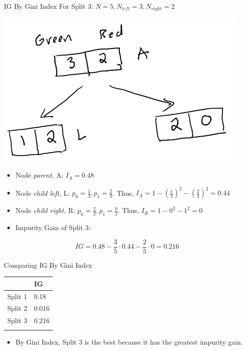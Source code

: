 \documentclass[
  ignorenonframetext,
]{beamer}
\providecommand{\tightlist}{%
  \setlength{\itemsep}{0pt}\setlength{\parskip}{0pt}}
\begin{document}
\begin{frame}{IG By Gini Index}
\label{ig-by-gini-index-2}
For Split 3: \(N = 5, N_{left} =3, N_{right} = 2\)

\includegraphics{images/im2.png}

\begin{itemize}
\item
  Node \emph{parent,} A: \(I_{A} = 0.48\)
\item
  Node \emph{child left,} L: \(p_0 = \frac{1}{3}, p_1 = \frac{2}{3}\).
  Thus, \(I_{A} = 1-(\frac{1}{3})^2 -(\frac{2}{3})^2 = 0.44\)
\item
  Node \emph{child right,} R: \(p_0 = \frac{2}{2}, p_1 = \frac{0}{2}\).
  Thus, \(I_{R} = 1-0^2-1^2 = 0\)
\item
  Impurity Gain of Split 3:
\end{itemize}

\[IG = 0.48 - \frac{3}{5} \cdot 0.44 - \frac{2}{5} \cdot 0 = 0.216\]
\end{frame}

\begin{frame}{Comparing IG By Gini Index}
\label{comparing-ig-by-gini-index}
\begin{longtable}[]{@{}ll@{}}
\toprule\noalign{}
& IG \\
\midrule\noalign{}
\endhead
Split 1 & 0.18 \\
Split 2 & 0.016 \\
Split 3 & 0.216 \\
\bottomrule\noalign{}
\end{longtable}

\begin{itemize}
\tightlist
\item
  By Gini Index, Split 3 is the best because it has the greatest
  impurity gain.
\end{itemize}
\end{frame}
\end{document}
